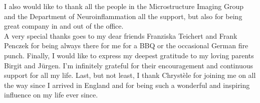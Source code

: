 \noindent
I also would like to thank all the people in the Microstructure Imaging Group and the Department of Neuroinflammation all the support, but also for being great company in and out of the office. \\

\noindent
A very special thanks goes to my dear friends Franziska Teichert and Frank Penczek for being always there for me for a BBQ or the occasional German fire punch. 
Finally, I would like to express my deepest gratitude to my loving parents Birgit and J\"urgen. I'm infinitely grateful for their encouragement and continuous support for all my life. Last, but not least, I thank Chrystèle for joining me on all the way since I arrived in England and for being such a wonderful and inspiring influence on my life ever since.
\vfill
\endgroup
